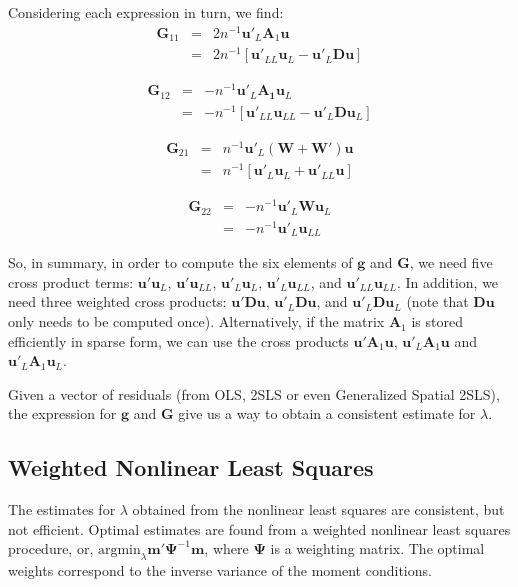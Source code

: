 \documentclass{article}
\begin{document}
Considering each expression in turn, we find:
\begin{eqnarray}
\mathbf{G}_{11} &=& 2 n^{-1} \mathbf{u'}_L \mathbf{A}_1 \mathbf{u}\label{eq:G11}\\
    &=& 2 n^{-1} [ \mathbf{u'}_{LL} \mathbf{u}_L - \mathbf{u'}_L \mathbf{D} \mathbf{u} ]\nonumber
\end{eqnarray}

\begin{eqnarray}
\mathbf{G}_{12} &=& - n^{-1} \mathbf{u'}_L \mathbf{A_1} \mathbf{u}_L\label{eq:G12}\\
   &=& - n^{-1} [ \mathbf{u'}_{LL} \mathbf{u}_{LL} - \mathbf{u'}_L \mathbf{D} \mathbf{u}_L ]\nonumber
\end{eqnarray}

\begin{eqnarray}
 \mathbf{G}_{21} &=& n^{-1} \mathbf{u'}_L (\mathbf{W} + \mathbf{W'}) \mathbf{u} \label{eq:G21}\\
   &=& n^{-1} [ \mathbf{u'}_L \mathbf{u}_L + \mathbf{u'}_{LL} \mathbf{u} ]\nonumber
\end{eqnarray}

\begin{eqnarray}
 \mathbf{G}_{22} &=& - n^{-1} \mathbf{u'}_L \mathbf{W} \mathbf{u}_L \label{eq:G22}\\
    &=& - n^{-1} \mathbf{u'}_L \mathbf{u}_{LL}\nonumber
\end{eqnarray}

So, in summary, in order to compute the six elements of $\mathbf{g}$ and $\mathbf{G}$,
we need five cross product terms: $\mathbf{u'} \mathbf{u}_L$, $\mathbf{u'} \mathbf{u}_{LL}$,
$\mathbf{u'}_L \mathbf{u}_L$, $\mathbf{u'}_L \mathbf{u}_{LL}$, and
$\mathbf{u'}_{LL} \mathbf{u}_{LL}$. In addition, we need three weighted cross products:
$\mathbf{u'} \mathbf{D} \mathbf{u}$, $\mathbf{u'}_L \mathbf{D} \mathbf{u}$, and
$\mathbf{u'}_L \mathbf{D} \mathbf{u}_L$ (note that $\mathbf{Du}$ only needs to be
computed once). Alternatively, if the matrix $\mathbf{A}_1$ is stored efficiently in sparse form,
we can use the cross products $\mathbf{u'}\mathbf{A}_1 \mathbf{u}$, $\mathbf{u'}_L \mathbf{A}_1 \mathbf{u}$ and $\mathbf{u'}_L \mathbf{A}_1 \mathbf{u}_L$.

Given a vector of residuals (from OLS, 2SLS or even Generalized Spatial 2SLS), the expression
for $\mathbf{g}$ and $\mathbf{G}$ give us a way to obtain a consistent estimate for $\lambda$.

\subsection{Weighted Nonlinear Least Squares}
The estimates for $\lambda$ obtained from the nonlinear least squares are consistent,
but not efficient. Optimal estimates are found from a weighted nonlinear least squares
procedure, or, $\mbox{argmin}_\lambda \mathbf{m'}\mathbf{\mathbf{\Psi}}^{-1} \mathbf{m}$, where $\mathbf{\Psi}$ is a weighting matrix.
The optimal weights correspond to the inverse variance of the moment conditions.
\end{document}
